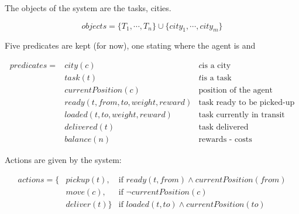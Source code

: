 \documentclass[11pt,a4paper]{article}
\begin{document}
The objects of the system are the tasks, cities.

$$ objects = \{T_1, \cdots, T_n\} \cup \{city_1, \cdots, city_m\} $$

Five predicates are kept (for now), one stating where the agent is and 

\begin{align*}
predicates = &city(c)                            & c \text{is a city} \\
             &task(t)                            & t \text{is a task} \\
             &currentPosition(c)                 & \text{position of the agent}      \\
             &ready(t, from, to, weight, reward) & \text{task ready to be picked-up} \\
             &loaded(t, to, weight, reward)      & \text{task currently in transit}  \\
             &delivered(t)                       & \text{task delivered}             \\
             &balance(n)                         & \text{rewards - costs}            
\end{align*}

Actions are given by the system:

\begin{align*}
actions = \{&pickup(t),   & \text{if } ready(t, from) \wedge currentPosition(from) \\
            &move(c),     & \text{if } \lnot currentPosition(c)                    \\
            &deliver(t)\} & \text{if } loaded(t, to) \wedge currentPosition(to)
\end{align*}
\end{document}
